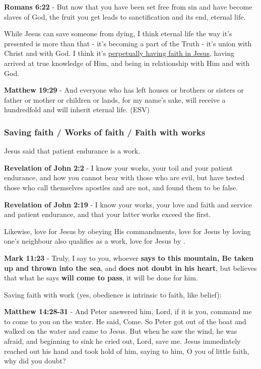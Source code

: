 \documentclass[11pt]{article}
\begin{document}
\textbf{Romans 6:22} - But now that you have been set free from sin and have become slaves of God, the fruit you get leads to sanctification and its end, eternal life.

While Jesus can save someone from dying, I think eternal life the way it's presented is more than that - it's becoming a part of the Truth - it's union with Christ and with God.
I think it's \uline{perpetually having faith in Jesus}, having arrived at true knowledge of Him, and being in relationship with Him and with God.

\textbf{Matthew 19:29} - And everyone who has left houses or brothers or sisters or father or mother or children or lands, for my name's sake, will receive a hundredfold and will inherit eternal life. (ESV)

\subsubsection{Saving faith / Works of faith / Faith with works}
\label{sec:org84c4ff1}
Jesus said that patient endurance is a work.

\textbf{Revelation of John 2:2} - I know your works, your toil and your patient endurance, and how you cannot bear with those who are evil, but have tested those who call themselves apostles and are not, and found them to be false.

\textbf{Revelation of John 2:19} - I know your works, your love and faith and service and patient endurance, and that your latter works exceed the first.

Likewise, love for Jesus by obeying His commandments, love for Jesus by loving one's neighbour also qualifies as a work, love for Jesus by .

\textbf{Mark 11:23} - Truly, I say to you, whoever \textbf{says to this mountain, Be taken up and thrown into the sea}, and \textbf{does not doubt in his heart}, but believes that what he says \textbf{will come to pass}, it will be done for him.

Saving faith with work (yes, obedience is intrinsic to faith, like belief):

\textbf{Matthew 14:28-31} - And Peter answered him, Lord, if it is you, command me to come to you on the water. He said, Come. So Peter got out of the boat and walked on the water and came to Jesus. But when he saw the wind, he was afraid, and beginning to sink he cried out, Lord, save me. Jesus immediately reached out his hand and took hold of him, saying to him, O you of little faith, why did you doubt?
\end{document}
